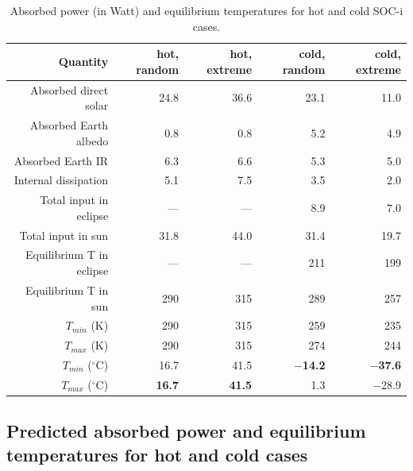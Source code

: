 \documentclass[]{aastex62}
\begin{document}
\begin{table}[t]
	\centering
	\caption{Absorbed power (in Watt) and equilibrium temperatures for hot and cold SOC-i cases. }
	\label{tab:powertemp}
	\begin{tabular}{r|r|r|r|r} %
		\hline
  	                    Quantity          & hot, random   &  hot, extreme &   cold, random  & cold, extreme   \\
		\hline
           Absorbed direct solar         &  24.8        &  36.6     &  23.1         &  11.0      \\
           Absorbed Earth albedo       &    0.8        &    0.8   &     5.2           &  4.9      \\    
               Absorbed Earth IR           &    6.3        &    6.6     &     5.3        &  5.0     \\
             Internal dissipation           &    5.1        &   7.5     &     3.5         &  2.0     \\
		\hline 
             Total input in eclipse       &     ---      &   ---   &     8.9       &    7.0  \\
              Total input in sun            &    31.8      &   44.0  &   31.4        &  19.7  \\
		\hline
              Equilibrium T in eclipse  &     ---     &    ---   &    211       &   199 \\
              Equilibrium T in sun       &      290      &   315   &    289        &  257  \\
 		\hline
                    $T_{min}$  (K)               &      290      &   315   &   259       &  235  \\
                   $T_{max}$  (K)               &      290      &   315   &   274        &  244  \\
		\hline
                    $T_{min}$  ($^\circ$C)   &       16.7         &  41.5             &  {\bf   $-$14.2  }  &  {\bf  $-$37.6}  \\
                   $T_{max}$  ($^\circ$C)    &  {\bf  16.7  }  &    {\bf  41.5}  &        1.3      &  $-$28.9   \\
		\hline
	\end{tabular} 
\end{table}

 


\subsection{Predicted absorbed power and equilibrium temperatures for hot and cold cases} 
\end{document}
